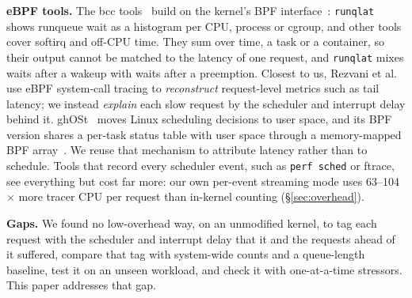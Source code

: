 \textbf{eBPF tools.} The bcc tools~\cite{bcc} build on the kernel's BPF
interface~\cite{kernelbpf}: \texttt{runqlat} shows runqueue wait as a
histogram per CPU, process or cgroup, and other tools cover softirq and
off-CPU time. They sum over time, a task or a container, so their output
cannot be matched to the latency of one request, and \texttt{runqlat} mixes
waits after a wakeup with waits after a preemption. Closest to us,
Rezvani et al.~\cite{rezvani2024ispass} use eBPF system-call tracing to
\emph{reconstruct} request-level metrics such as tail latency; we instead
\emph{explain} each slow request by the scheduler and interrupt delay behind it.
ghOSt~\cite{humphries2021ghost} moves Linux scheduling decisions to user
space, and its BPF version shares a per-task status table with user space
through a memory-mapped BPF array~\cite{rhoden2022ghostbpf}. We reuse that
mechanism to attribute latency rather than to schedule. Tools that record
every scheduler event, such as \texttt{perf sched} or ftrace, see
everything but cost far more: our own per-event streaming mode uses
63--104$\times$ more tracer CPU per request than in-kernel counting
(\S\ref{sec:overhead}).

\textbf{Gaps.} We found no low-overhead way, on an unmodified kernel, to
tag each request with the scheduler and interrupt delay that it and the
requests ahead of it suffered, compare that tag with system-wide counts and
a queue-length baseline, test it on an unseen workload, and check it with
one-at-a-time stressors. This paper addresses that gap.
